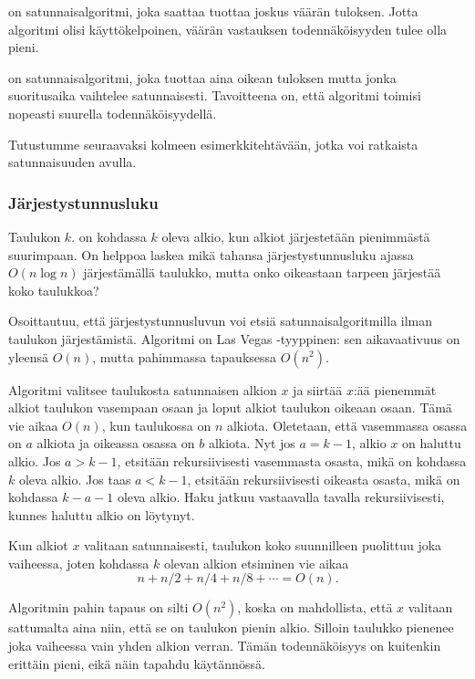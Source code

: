 
 on satunnaisalgoritmi,
joka saattaa tuottaa joskus väärän tuloksen.
Jotta algoritmi olisi käyttökelpoinen,
väärän vastauksen todennäköisyyden tulee olla pieni.


 on satunnaisalgoritmi,
joka tuottaa aina oikean tuloksen mutta jonka
suoritusaika vaihtelee satunnaisesti.
Tavoitteena on, että algoritmi toimisi nopeasti
suurella todennäköisyydellä.

Tutustumme seuraavaksi kolmeen esimerkkitehtävään,
jotka voi ratkaista satunnaisuuden avulla.

\subsubsection{Järjestystunnusluku}


Taulukon $k$. 
on kohdassa $k$ oleva alkio,
kun alkiot järjestetään
pienimmästä suurimpaan.
On helppoa laskea mikä tahansa
järjestystunnusluku ajassa $O(n \log n)$
järjestämällä taulukko,
mutta onko oikeastaan tarpeen järjestää koko taulukkoa?

Osoittautuu, että järjestystunnusluvun
voi etsiä satunnaisalgoritmilla ilman taulukon
järjestämistä.
Algoritmi on Las Vegas -tyyppinen:
sen aikavaativuus on yleensä $O(n)$,
mutta pahimmassa tapauksessa $O(n^2)$.

Algoritmi valitsee taulukosta satunnaisen alkion $x$
ja siirtää $x$:ää pienemmät alkiot
taulukon vasempaan osaan ja loput alkiot
taulukon oikeaan osaan.
Tämä vie aikaa $O(n)$, kun taulukossa on $n$ alkiota.
Oletetaan, että vasemmassa osassa on $a$
alkiota ja oikeassa osassa on $b$ alkiota.
Nyt jos $a=k-1$, alkio $x$ on haluttu alkio.
Jos $a>k-1$, etsitään rekursiivisesti
vasemmasta osasta, mikä on kohdassa $k$ oleva alkio.
Jos taas $a<k-1$, etsitään rekursiivisesti
oikeasta osasta, mikä on kohdassa $k-a-1$ oleva alkio.
Haku jatkuu vastaavalla tavalla rekursiivisesti,
kunnes haluttu alkio on löytynyt.

Kun alkiot $x$ valitaan satunnaisesti,
taulukon koko suunnilleen puolittuu
joka vaiheessa, joten kohdassa $k$ olevan
alkion etsiminen vie aikaa
\[n+n/2+n/4+n/8+\cdots=O(n).\]

Algoritmin pahin tapaus on silti $O(n^2)$,
koska on mahdollista,
että $x$ valitaan sattumalta aina niin,
että se on taulukon pienin alkio.
Silloin taulukko pienenee joka vaiheessa
vain yhden alkion verran.
Tämän todennäköisyys on kuitenkin erittäin pieni,
eikä näin tapahdu käytännössä.

